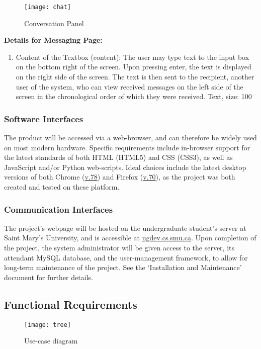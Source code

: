 \documentclass[11pt]{article}
\begin{document}
\begin{figure}
    \texttt{[image: chat]}
    \caption{Conversation Panel}
\end{figure}
\pagebreak

\noindent \textbf{Details for Messaging Page:}
\begin{enumerate}
    \item Content of the Textbox (content): The user may type text to the input box on the bottom
        right of the screen. Upon pressing enter, the text is displayed on the right side of the
        screen. The text is then sent to the recipient, another user of the system, who can view
        received messages on the left side of the screen in the chronological order of which they
        were received. Text, size: 100
\end{enumerate}
\FloatBarrier

\subsubsection{Software Interfaces}
The product will be accessed via a web-browser, and can therefore be widely used on most modern
hardware. Specific requirements include in-browser support for the latest standards of both HTML
(HTML5) and CSS (CSS3), as well as JavaScript and/or Python web-scripts. Ideal choices include the
latest desktop versions of both Chrome (\url{v.78}) and Firefox (\url{v.70}), as the project was
both created and tested on these platform.

\subsubsection{Communication Interfaces}
The project's webpage will be hosted on the undergraduate student's server at Saint Mary's
University, and is accessible at \url{ugdev.cs.smu.ca}. Upon completion of the project, the system
administrator will be given access to the server, its attendant MySQL database, and the
user-management framework, to allow for long-term maintenance of the project. See the `Installation
and Maintenance' document for further details.

\subsection{Functional Requirements}

\begin{figure}[!htb]
  \texttt{[image: tree]}
  \caption{Use-case diagram}
\end{figure}
\end{document}
